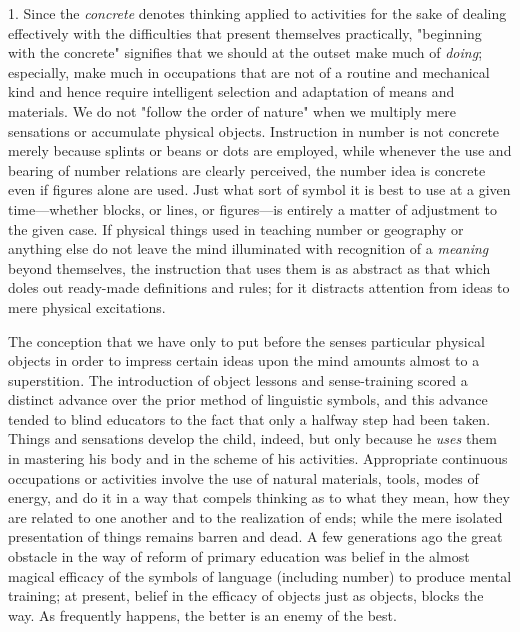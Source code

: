 \documentclass[letterpaper]{book}
\begin{document}
1. Since the \emph{concrete} denotes thinking applied to activities for
the sake of dealing effectively with the difficulties that present
themselves practically, "beginning with the concrete" signifies that we
should at the outset make much of \emph{doing}; especially, make much in
occupations that are not of a routine and mechanical kind and hence
require intelligent selection and adaptation of means and materials. We
do not "follow the order of nature" when we multiply mere sensations or
accumulate physical objects. Instruction in number is not concrete
merely because splints or beans or dots are employed, while whenever the
use and bearing of number relations are clearly perceived, the number
idea is concrete even if figures alone are used. Just what sort
of
symbol it is best to use at a given time---whether blocks, or lines, or
figures---is entirely a matter of adjustment to the given case. If
physical things used in teaching number or geography or anything else do
not leave the mind illuminated with recognition of a \emph{meaning}
beyond themselves, the instruction that uses them is as abstract as that
which doles out ready-made definitions and rules; for it distracts
attention from ideas to mere physical excitations.


The conception that we have only to put before the senses particular
physical objects in order to impress certain ideas upon the mind amounts
almost to a superstition. The introduction of object lessons and
sense-training scored a distinct advance over the prior method of
linguistic symbols, and this advance tended to blind educators to the
fact that only a halfway step had been taken. Things and sensations
develop the child, indeed, but only because he \emph{uses} them in
mastering his body and in the scheme of his activities. Appropriate
continuous occupations or activities involve the use of natural
materials, tools, modes of energy, and do it in a way that compels
thinking as to what they mean, how they are related to one another and
to the realization of ends; while the mere isolated presentation of
things remains barren and dead. A few generations ago the great obstacle
in the way of reform of primary education was belief in the almost
magical efficacy of the symbols of language (including number) to
produce mental training; at present, belief in the efficacy of objects
just as objects, blocks the way. As frequently happens, the better is an
enemy of the best.
\end{document}
